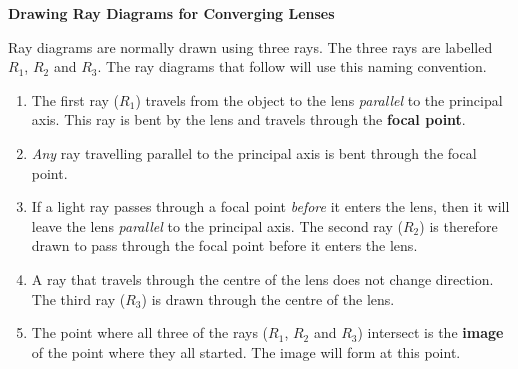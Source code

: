 \textbf{Drawing Ray Diagrams for Converging Lenses}

Ray diagrams are normally drawn using three rays. The three rays are labelled $R_{1}$, $R_{2}$ and $R_{3}$. The ray diagrams that follow will use this naming convention.
\begin{enumerate}
\item{The first ray ($R_{1}$) travels from the object to the lens \textit{parallel} to the principal axis. This ray is bent by the lens and travels through the \textbf{focal point}.}
\item{\textit{Any} ray travelling parallel to the principal axis is bent through the focal point.}
\item{If a light ray passes through a focal point \textit{before} it enters the lens, then it will leave the lens \textit{parallel} to the principal axis. The second ray ($R_2$) is therefore drawn to pass through the focal point before it enters the lens.}
\item{A ray that travels through the centre of the lens does not change direction. The third ray ($R_3$) is drawn through the centre of the lens.}
\item{The point where all three of the rays ($R_{1}$, $R_{2}$ and $R_{3}$) intersect is the \textbf{image} of the point where they all started. The image will form at this point.}
\end{enumerate}



